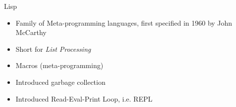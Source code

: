 \documentclass[pdf]{beamer}
\begin{document}
\begin{frame}{Lisp}
  \begin{figure}[H]
    \centering
    \hspace{0.2cm}
  \end{figure}
    \centering
    \begin{itemize}
    \item Family of Meta-programming languages, first specified in 1960 by John McCarthy
    \item Short for \textit{List Processing}
    \item Macros (meta-programming)
    \item Introduced garbage collection
    \item Introduced Read-Eval-Print Loop, i.e. REPL
    \end{itemize}
\end{frame}
\end{document}
